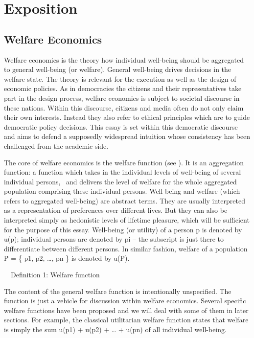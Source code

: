 \chapter{Exposition}
\section{Welfare Economics}

Welfare economics is the theory how individual well-being should be aggregated to general well-being (or welfare). General well-being drives decisions in the welfare state. The theory is relevant for the execution as well as the design of economic policies. As in democracies the citizens and their representatives take part in the design process, welfare economics is subject to societal discourse in these nations. Within this discourse, citizens and media often do not only claim their own interests. Instead they also refer to ethical principles which are to guide democratic policy decisions. This essay is set within this democratic discourse and aims to defend a supposedly widespread intuition whose consistency has been challenged from the academic side.  

The core of welfare economics is the welfare function (see ). It is an aggregation function: a function which takes in the individual levels of well-being of several individual persons, \ and delivers the level of welfare for the whole aggregated population comprising these individual persons. Well-being and welfare (which refers to aggregated well-being) are abstract terms. They are usually interpreted as a representation of preferences over different lives. But they can also be interpreted simply as hedonistic levels of lifetime pleasure, which will be sufficient for the purpose of this essay. Well-being (or utility) of a person p is denoted by u(p); individual persons are denoted by pi – the subscript is just there to differentiate between different persons. In similar fashion, welfare of a population P = \{ p1, p2, …, pn \} is denoted by u(P). 

\ \ Definition 1: Welfare function 
\begin{comment}
\ \ w: \ \ [D835?][DCDF?]($\mathbb{R}$+) \ding{213} $\mathbb{R}$+, \ \ \ \ \{ u(p1), u(p2), …, u(pn) \} \ \ $\mapsto $ \ \ u( \{ p1, p2, …, pn \} ) 
\end{comment}

The content of the general welfare function is intentionally unspecified. The function is just a vehicle for discussion within welfare economics. Several specific welfare functions have been proposed and we will deal with some of them in later sections. For example, the classical utilitarian welfare function states that welfare is simply the sum u(p1) + u(p2) + … + u(pn) of all individual well-being.  

